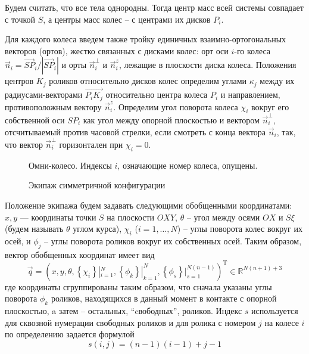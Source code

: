 Будем считать, что все тела однородны. Тогда центр масс всей системы совпадает с точкой $S$, а центры масс колес -- с центрами их дисков $P_i$.

Для каждого колеса введем также тройку единичных взаимно-ортогональных векторов (ортов), жестко связанных с дисками колес: орт оси $i$-го колеса $\vec{n}_i = \vec{SP}_i/|\vec{SP}_i|$ и орты $\vec{n}_i^\perp$ и $\vec{n}_i^z$, лежащие в плоскости диска колеса. Положения центров $K_j$ роликов относительно дисков колес определим углами $\kappa_j$ между их радиусами-векторами $\overrightarrow{P_iK_j}$ относительно центра колеса $P_i$ и направлением, противоположным вектору $\vec{n}_i^z$. Определим угол поворота колеса $\chi_i$ вокруг его собственной оси $SP_i$ как угол между опорной плоскостью и вектором $\vec{n}_i^\perp$, отсчитываемый против часовой стрелки, если смотреть с конца вектора $\vec{n}_i$, так, что вектор $\vec{n}_i^\perp$ горизонтален при $\chi_i = 0$.

\begin{center}
    \begin{figure}[h]
            \centering
            \caption{Омни-колесо. Индексы $i$, означающие номер колеса, опущены.}
            \label{fig:wheel}
        \endminipage
        \quad
            \centering
            \caption{Экипаж симметричной конфигурации}
            \label{fig:vehicle}
        \endminipage
    \end{figure}
\end{center}

Положение экипажа будем задавать следующими обобщенными координатами:
$x, y$ --- координаты точки $S$ на плоскости $OXY$, $\theta$ -- угол между осями $OX$ и $S\xi$ (будем называть $\theta$ углом курса),
$\chi_i$ ($i = 1,\dots,N$) -- углы поворота колес вокруг их осей, и $\phi_j$ -- углы поворота роликов вокруг их собственных осей.
Таким образом, вектор обобщенных координат имеет вид
$$\vec{q} = (
    x, y, \theta,
    \left\{\chi_i\right\}|_{i=1}^N,
    \left\{\phi_k\right\}|_{k=1}^N,
    \left\{\phi_s\right\}|_{s=1}^{N(n - 1)}
)^{\mathop{T}}\in\mathbb{R}^{N(n+1) + 3}$$ 
где координаты сгруппированы таким образом, что сначала указаны углы поворота $\phi_k$ роликов, находящихся в данный момент в контакте с опорной плоскостью, a затем -- остальных, ``cвободных'', роликов. Индекс $s$ используется для сквозной нумерации свободных роликов и для ролика с номером $j$ на колесе $i$ по определению задается формулой
\begin{equation}\label{eq:num}
    s(i, j) = (n-1)(i-1) + j - 1
\end{equation}

